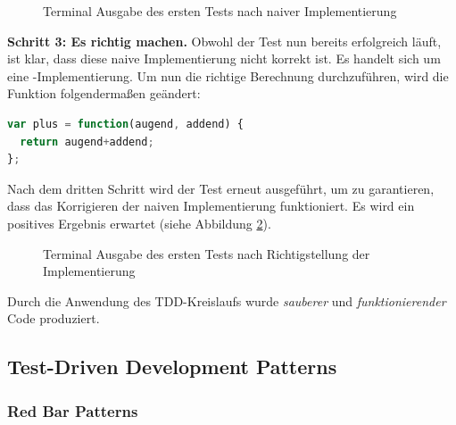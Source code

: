 \begin{figure}[H]
  \centering
  \caption{Terminal Ausgabe des ersten Tests nach naiver Implementierung}
  \label{figure:tdd-simple-step-1-2}
\end{figure}

\textbf{Schritt 3: Es richtig machen.}\newline
Obwohl der Test nun bereits erfolgreich läuft, ist klar, dass diese naive Implementierung nicht korrekt ist. Es handelt sich um eine -Implementierung. Um nun die richtige Berechnung durchzuführen, wird die Funktion  folgendermaßen geändert:

\begin{lstlisting}[language=JavaScript, caption=TDD - Calculus - Simple addition - Refactoring]
var plus = function(augend, addend) {
  return augend+addend;
};
\end{lstlisting}

Nach dem dritten Schritt wird der Test erneut ausgeführt, um zu garantieren, dass das Korrigieren der naiven Implementierung funktioniert. Es wird ein positives Ergebnis erwartet (siehe Abbildung \ref{figure:tdd-simple-step-1-3}).

\begin{figure}[H]
  \centering
  \caption{Terminal Ausgabe des ersten Tests nach Richtigstellung der Implementierung}
  \label{figure:tdd-simple-step-1-3}
\end{figure}

Durch die Anwendung des TDD-Kreislaufs wurde \textit{sauberer} und \textit{funktionierender} Code produziert.

\newpage
\subsection{Test-Driven Development Patterns}
\subsubsection{Red Bar Patterns}

